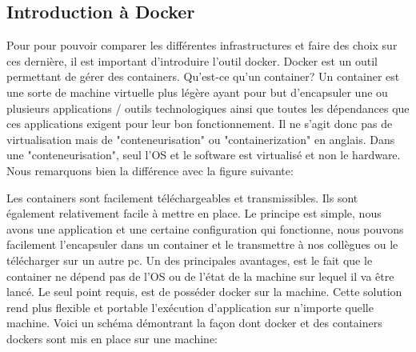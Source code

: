 \documentclass[
    iai, %
    il, %
]{heig-tb}
\begin{document}
\subsection{Introduction à Docker}
Pour pour pouvoir comparer les différentes infrastructures et faire des choix sur ces dernière, il est important d'introduire l'outil \Gls{docker}.
Docker est un outil permettant de gérer des containers.
Qu'est-ce qu'un container? Un container est une sorte de machine virtuelle plus légère ayant pour but d'encapsuler une ou plusieurs applications / outils technologiques ainsi que toutes les dépendances que ces applications exigent pour leur bon fonctionnement.
Il ne s'agit donc pas de virtualisation mais de "conteneurisation" ou "containerization" en anglais.
Dans une "conteneurisation", seul l'OS et le software est virtualisé et non le hardware.
Nous remarquons bien la différence avec la figure suivante: %

Les containers sont facilement téléchargeables et transmissibles. Ils sont également relativement facile à mettre en place.
Le principe est simple, nous avons une application et une certaine configuration qui fonctionne, nous pouvons facilement l'encapsuler dans un container et le transmettre à nos collègues ou le télécharger sur un autre pc.
Un des principales avantages, est le fait que le container ne dépend pas de l'OS ou de l'état de la machine sur lequel il va être lancé.
Le seul point requis, est de posséder docker sur la machine.
Cette solution rend plus flexible et portable l'exécution d'application sur n'importe quelle machine.
Voici un schéma démontrant la façon dont docker et des containers dockers sont mis en place sur une machine: %
\end{document}
